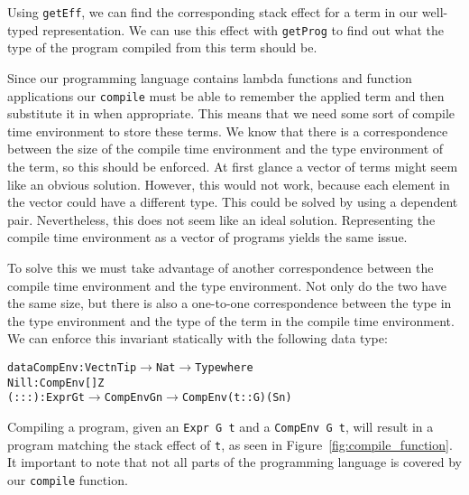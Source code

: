 Using \texttt{getEff}, we can find the corresponding stack effect for a term in our well-typed representation. We can use this effect with \texttt{getProg} to find out what the type of the program compiled from this term should be.

Since our programming language contains lambda functions and function applications our \texttt{compile} must be able to remember the applied term and then substitute it in when appropriate. This means that we need some sort of compile time environment to store these terms. We know that there is a correspondence between the size of the compile time environment and the type environment of the term, so this should be enforced. At first glance a vector of terms might seem like an obvious solution. However, this would not work, because each element in the vector could have a different type. This could be solved by using a dependent pair. Nevertheless, this does not seem like an ideal solution. Representing the compile time environment as a vector of programs yields the same issue.

To solve this we must take advantage of another correspondence between the compile time environment and the type environment. Not only do the two have the same size, but there is also a one-to-one correspondence between the type in the type environment and the type of the term in the compile time environment. We can enforce this invariant statically with the following data type:

\begin{alltt}
data CompEnv : Vect n Tip \(\to\) Nat \(\to\) Type where
	Nill  : CompEnv [] Z
	(:::) : Expr G t \(\to\) CompEnv G n \(\to\) CompEnv (t :: G) (S n)
\end{alltt}

Compiling a program, given an \texttt{Expr G t} and a \texttt{CompEnv G t}, will result in a program matching the stack effect of \texttt{t}, as seen in Figure~\ref{fig:compile_function}. It important to note that not all parts of the programming language is covered by our \texttt{compile} function.

